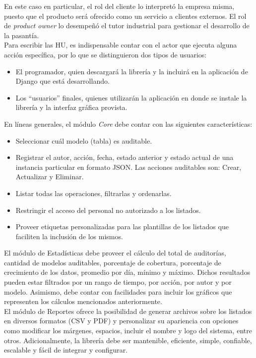 En este caso en particular, el rol del cliente lo interpretó la empresa misma, puesto que el producto será ofrecido como un servicio a clientes externos. El rol de \textit{product owner} lo desempeñó el tutor industrial para gestionar el desarrollo de la pasantía. \\

Para escribir las HU, es indispensable contar con el actor que ejecuta alguna acción específica, por lo que se distinguieron dos tipos de usuarios:

\begin{itemize}
    \item El programador, quien descargará la librería y la incluirá en la aplicación de Django que está desarrollando.
    \item Los “usuarios” finales, quienes utilizarán la aplicación en donde se instale la librería y la interfaz gráfica provista.
\end{itemize}

En líneas generales, el módulo \textit{Core} debe contar con las siguientes características:

\begin{itemize}
    \item Seleccionar cuál modelo (tabla) es auditable.
    \item Registrar el autor, acción, fecha, estado anterior y estado actual de una instancia particular en formato JSON. Las acciones auditables son: Crear, Actualizar y Eliminar.
    \item Listar todas las operaciones, filtrarlas y ordenarlas.
    \item Restringir el acceso del personal no autorizado a los listados.
    \item Proveer etiquetas personalizadas para las plantillas de los listados que faciliten la inclusión de los mismos.
\end{itemize}

El módulo de Estadísticas debe proveer el cálculo del total de auditorías, cantidad de modelos auditables, porcentaje de cobertura, porcentaje de crecimiento de los datos, promedio por día, mínimo y máximo. Dichos resultados pueden estar filtrados por un rango de tiempo, por acción, por autor y por modelo. Asimismo, debe contar con facilidades para incluir los gráficos que representen los cálculos mencionados anteriormente. \\

El módulo de Reportes ofrece la posibilidad de generar archivos sobre los listados en diversos formatos (CSV y PDF) y personalizar su apariencia con opciones como modificar los márgenes, espacios, incluir el nombre y logo del sistema, entre otros. Adicionalmente, la librería debe ser mantenible, eficiente, simple, confiable, escalable y fácil de integrar y configurar.\\

